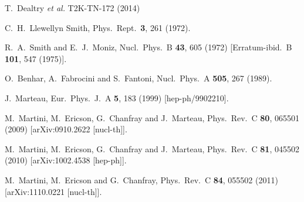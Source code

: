 \documentclass[%
reprint,
superscriptaddress,
 amsmath,amssymb,
 aps,
floatfix,
]{revtex4-1}
\begin{document}
\begin{thebibliography}{99}

  T.~Dealtry {\it et al.}
  T2K-TN-172 (2014)

  C.~H.~Llewellyn Smith,
  Phys.\ Rept.\  {\bf 3}, 261 (1972).

  R.~A.~Smith and E.~J.~Moniz,
  Nucl.\ Phys.\ B {\bf 43}, 605 (1972)
  [Erratum-ibid.\ B {\bf 101}, 547 (1975)].

  O.~Benhar, A.~Fabrocini and S.~Fantoni,
  Nucl.\ Phys.\ A {\bf 505}, 267 (1989).

  J.~Marteau,
  Eur.\ Phys.\ J.\ A {\bf 5}, 183 (1999)
  [hep-ph/9902210].

  M.~Martini, M.~Ericson, G.~Chanfray and J.~Marteau,
  Phys.\ Rev.\ C {\bf 80}, 065501 (2009)
  [arXiv:0910.2622 [nucl-th]].

  M.~Martini, M.~Ericson, G.~Chanfray and J.~Marteau,
  Phys.\ Rev.\ C {\bf 81}, 045502 (2010)
  [arXiv:1002.4538 [hep-ph]].

  M.~Martini, M.~Ericson and G.~Chanfray,
  Phys.\ Rev.\ C {\bf 84}, 055502 (2011)
  [arXiv:1110.0221 [nucl-th]].


\end{thebibliography}
\end{document}
